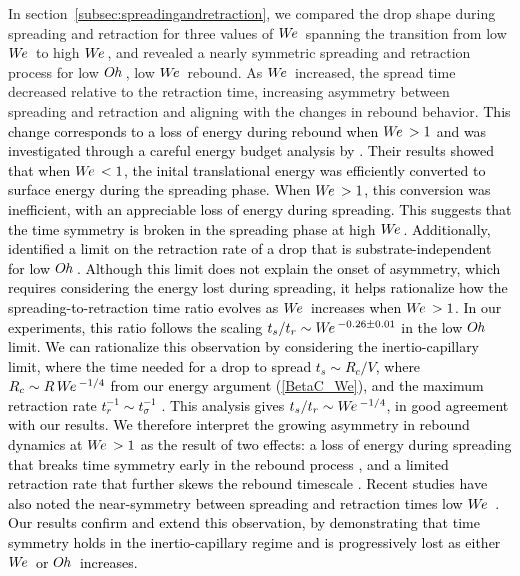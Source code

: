 \documentclass{jfm}
\newcommand{\edit}[1]{\textcolor{black}{#1}}
\newcommand{\We}{W\kern-0.15em e\,}
\newcommand{\Oh}{O\kern-0.05em h\,}
\begin{document}
In section~\ref{subsec:spreadingandretraction}, we compared the drop shape during spreading and retraction for three values of $\We$ spanning the transition from low $\We$ to high $\We$, and revealed a nearly symmetric spreading and retraction process for low $\Oh$, low $\We$ rebound. As $\We$ increased, the spread time decreased relative to the retraction time, increasing asymmetry between spreading and retraction and aligning with the changes in rebound behavior. \edit{This change corresponds to a loss of energy during rebound when $\We>1$ and was investigated through a careful energy budget analysis by \citet{gilet2012droplets}. Their results showed that when $\We<1$, the inital translational energy was efficiently converted to surface energy during the spreading phase. When $\We>1$, this conversion was inefficient, with an appreciable loss of energy during spreading. This suggests that the time symmetry is broken in the spreading phase at high $\We$. Additionally, \citet{bartolo2005retraction} identified a limit on the retraction rate of a drop that is substrate-independent for low $\Oh$. Although this limit does not explain the onset of asymmetry, which requires considering the energy lost during spreading, it helps rationalize how the spreading-to-retraction time ratio evolves as $\We$ increases when $\We>1$.} \edit{In our experiments, this ratio follows the scaling $t_{s}/t_{r} \sim \We^{-0.26 \pm 0.01}$ in the low $\Oh$ limit. We can rationalize this observation by considering the inertio-capillary limit, where the time needed for a drop to spread $t_{s} \sim R_{c} / V$, where $R_{c} \sim R \, \We^{-1/4}$ from our energy argument (\ref{BetaC_We}), and the maximum retraction rate $t_{r}^{-1} \sim t_{\sigma}^{-1}$ \citep{bartolo2005retraction}. This analysis gives $t_{s} / t_{r} \sim \We^{-1/4}$, in good agreement with our results.} \edit{We therefore interpret the growing asymmetry in rebound dynamics at $\We > 1$ as the result of two effects: a loss of energy during spreading that breaks time symmetry early in the rebound process \citep{gilet2012droplets}, and a limited retraction rate that further skews the rebound timescale \citep{bartolo2005retraction}.  Recent studies have also noted the near-symmetry between spreading and retraction times low $\We$ \citep{lin2024probing}. Our results confirm and extend this observation, by demonstrating that time symmetry holds in the inertio-capillary regime and is progressively lost as either $\We$ or $\Oh$ increases.} 
\end{document}
